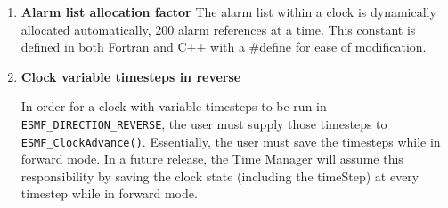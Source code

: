 
\begin{enumerate}

\item {\bf Alarm list allocation factor}  The alarm list within a clock is
dynamically allocated automatically, 200 alarm references at a time.
This constant is defined in both Fortran and C++ with a \#define for ease
of modification.

\item {\bf Clock variable timesteps in reverse} 
\begin{sloppypar}
In order for a clock with
variable timesteps to be run in {\tt ESMF\_DIRECTION\_REVERSE}, the user must
supply those timesteps to {\tt ESMF\_ClockAdvance()}.  Essentially, the user
must save the timesteps while in forward mode.  In a future release, the
Time Manager will assume this responsibility by saving the clock state
(including the timeStep) at every timestep while in forward mode.
\end{sloppypar}

\end{enumerate}
